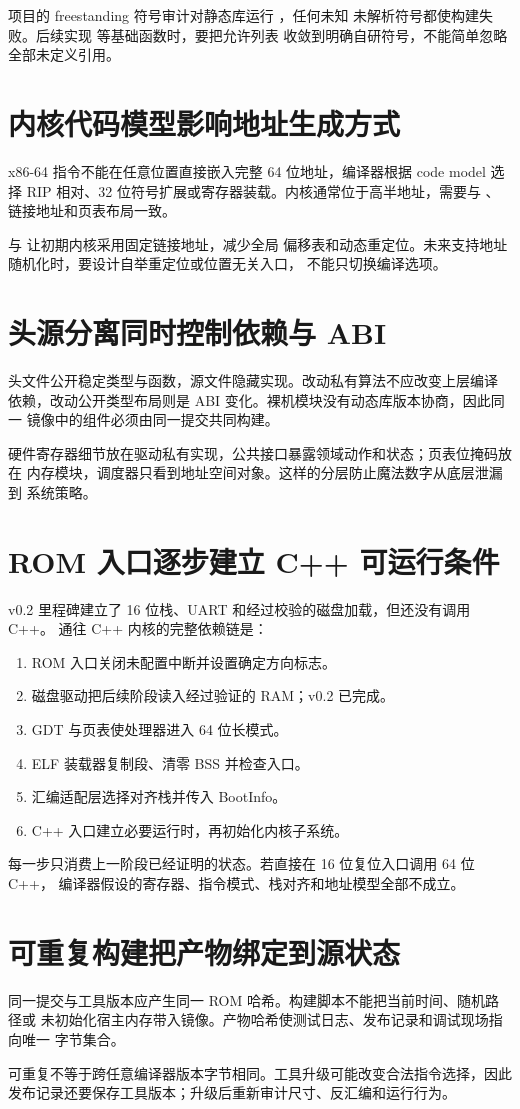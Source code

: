 项目的 freestanding 符号审计对静态库运行 ，任何未知
未解析符号都使构建失败。后续实现  等基础函数时，要把允许列表
收敛到明确自研符号，不能简单忽略全部未定义引用。

\section{内核代码模型影响地址生成方式}

x86-64 指令不能在任意位置直接嵌入完整 64 位地址，编译器根据 code model
选择 RIP 相对、32 位符号扩展或寄存器装载。内核通常位于高半地址，需要与
、链接地址和页表布局一致。

 与  让初期内核采用固定链接地址，减少全局
偏移表和动态重定位。未来支持地址随机化时，要设计自举重定位或位置无关入口，
不能只切换编译选项。

\section{头源分离同时控制依赖与 ABI}

头文件公开稳定类型与函数，源文件隐藏实现。改动私有算法不应改变上层编译
依赖，改动公开类型布局则是 ABI 变化。裸机模块没有动态库版本协商，因此同一
镜像中的组件必须由同一提交共同构建。

硬件寄存器细节放在驱动私有实现，公共接口暴露领域动作和状态；页表位掩码放在
内存模块，调度器只看到地址空间对象。这样的分层防止魔法数字从底层泄漏到
系统策略。

\section{ROM 入口逐步建立 C++ 可运行条件}

v0.2 里程碑建立了 16 位栈、UART 和经过校验的磁盘加载，但还没有调用 C++。
通往 C++ 内核的完整依赖链是：

\begin{enumerate}[label=\arabic*.]
  \item ROM 入口关闭未配置中断并设置确定方向标志。
  \item 磁盘驱动把后续阶段读入经过验证的 RAM；v0.2 已完成。
  \item GDT 与页表使处理器进入 64 位长模式。
  \item ELF 装载器复制段、清零 BSS 并检查入口。
  \item 汇编适配层选择对齐栈并传入 BootInfo。
  \item C++ 入口建立必要运行时，再初始化内核子系统。
\end{enumerate}

每一步只消费上一阶段已经证明的状态。若直接在 16 位复位入口调用 64 位 C++，
编译器假设的寄存器、指令模式、栈对齐和地址模型全部不成立。

\section{可重复构建把产物绑定到源状态}

同一提交与工具版本应产生同一 ROM 哈希。构建脚本不能把当前时间、随机路径或
未初始化宿主内存带入镜像。产物哈希使测试日志、发布记录和调试现场指向唯一
字节集合。

可重复不等于跨任意编译器版本字节相同。工具升级可能改变合法指令选择，因此
发布记录还要保存工具版本；升级后重新审计尺寸、反汇编和运行行为。
